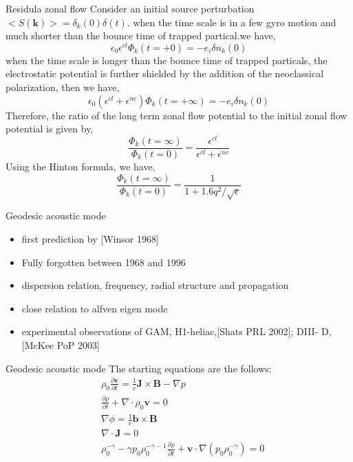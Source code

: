 \documentclass{beamer}
\begin{document}
\begin{frame}{Residula zonal flow}
	Consider an initial source perturbation $<S(\pmb{k})>=\delta_k(0)\delta(t)$. when the time scale is in a few gyro motion and much shorter than the bounce time of trapped partical.we have,
	\begin{equation}
	\epsilon_0\epsilon^{cl}\Phi_k(t=+0)=-e_i\delta{n_k(0)}
	\end{equation} 
	when the time scale is longer than the bounce time of trapped particals, the electrostatic potential is further shielded by the addition of the neoclassical polarization, then we have,
	\begin{equation}
	\epsilon_0(\epsilon^{cl}+\epsilon^{nc})\Phi_k(t=+\infty)=-e_i\delta{n_k(0)}
	\end{equation}
	Therefore, the ratio of the long term zonal flow potential to the initial zonal flow potential is given by, 
	\begin{equation}
	\frac{\Phi_k(t=\infty)}{\Phi_k(t=0)}=\frac{\epsilon^{cl}}{\epsilon^{cl}+\epsilon^{nc}}
	\end{equation}
	Using the Hinton formula, we have,
	\begin{equation}
	\frac{\Phi_k(t=\infty)}{\Phi_k(t=0)}=\frac{1}{1+1.6q^2/\sqrt{\epsilon}}
	\end{equation}
\end{frame}


\begin{frame}{Geodesic acoustic mode}
	\begin{itemize}
		\item first prediction by [Winsor 1968]
		\item Fully forgotten between 1968 and 1996
		\item dispersion relation, frequency, radial structure and propagation
		\item close relation to alfven eigen mode
		\item experimental observations of GAM, H1-heliac,[Shats PRL 2002]; DIII-
		D, [McKee PoP 2003]
	\end{itemize}
\end{frame}

\begin{frame}{Geodesic acoustic mode}
	The starting equations are the follows:
	\begin{equation}
	\begin{aligned}
	&\rho_0\frac{\partial{\pmb{v}}}{\partial{t}}=\frac{1}{c}\pmb{J}\times\pmb{B}-\nabla{p}	\\
	&\frac{\partial\rho}{\partial{t}}+\nabla\cdot\rho_0\pmb{v}=0	\\
	&\nabla\phi=\frac{1}{c}\pmb{b}\times\pmb{B}	\\
	&\nabla\cdot\pmb{J}=0	\\
	&\rho_0^{-\gamma}-\gamma{p_0}\rho_0^{-\gamma-1}\frac{\partial{\rho}}{\partial{t}}+\pmb{v}\cdot\nabla({p_0}\rho_0^{-\gamma})=0
	\end{aligned}
	\end{equation}	
\end{frame}
\end{document}
